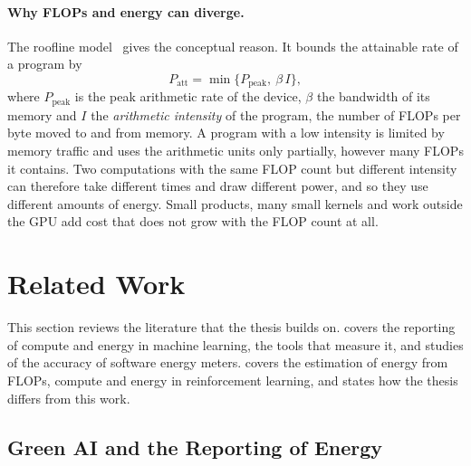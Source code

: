 \paragraph{Why FLOPs and energy can diverge.} The roofline model~\cite{williams2009roofline} gives the conceptual reason.
It bounds the attainable rate of a program by
\begin{equation}
  P_{\mathrm{att}} = \min\bigl\{P_{\mathrm{peak}},\ \beta\, I\bigr\},
  \label{eq:bg-roofline}
\end{equation}
where $P_{\mathrm{peak}}$ is the peak arithmetic rate of the device, $\beta$ the bandwidth of its memory and $I$ the \emph{arithmetic intensity} of the program, the number of FLOPs per byte moved to and from memory.
A program with a low intensity is limited by memory traffic and uses the arithmetic units only partially, however many FLOPs it contains.
Two computations with the same FLOP count but different intensity can therefore take different times and draw different power, and so they use different amounts of energy.
Small products, many small kernels and work outside the GPU add cost that does not grow with the FLOP count at all.


\section{Related Work}\label{sec:related}

This section reviews the literature that the thesis builds on.
 covers the reporting of compute and energy in machine learning,  the tools that measure it, and  studies of the accuracy of software energy meters.
 covers the estimation of energy from FLOPs,  compute and energy in reinforcement learning, and  states how the thesis differs from this work.

\subsection{Green AI and the Reporting of Energy}\label{sec:related-green}


